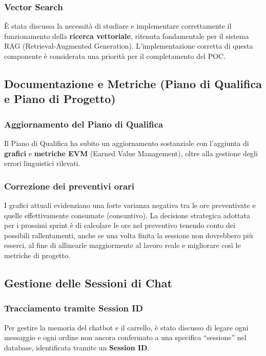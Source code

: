 \documentclass[a4paper, 11pt, oneside]{scrartcl}
\begin{document}
\subsubsection{Vector Search}
È stata discussa la necessità di studiare e implementare correttamente il funzionamento della \textbf{ricerca vettoriale}, ritenuta fondamentale per il sistema RAG (Retrieval-Augmented Generation). L'implementazione corretta di questa componente è considerata una priorità per il completamento del POC.

\subsection{Documentazione e Metriche (Piano di Qualifica e Piano di Progetto)}

\subsubsection{Aggiornamento del Piano di Qualifica}
Il Piano di Qualifica ha subito un aggiornamento sostanziale con l'aggiunta di \textbf{grafici} e \textbf{metriche EVM} (Earned Value Management), oltre alla gestione degli errori linguistici rilevati.

\subsubsection{Correzione dei preventivi orari}
I grafici attuali evidenziano una forte varianza negativa tra le ore preventivate e quelle effettivamente consumate (consuntivo). La decisione strategica adottata per i prossimi sprint è di calcolare le ore nel preventivo tenendo conto dei possibili rallentamenti, anche se una volta finita la sessione non dovrebbero più esserci, al fine di allinearle maggiormente al lavoro reale e migliorare così le metriche di progetto.

\subsection{Gestione delle Sessioni di Chat}

\subsubsection{Tracciamento tramite Session ID}
Per gestire la memoria del chatbot e il carrello, è stato discusso di legare ogni messaggio e ogni ordine non ancora confermato a una specifica ``sessione'' nel database, identificata tramite un \textbf{Session ID}.
\end{document}
